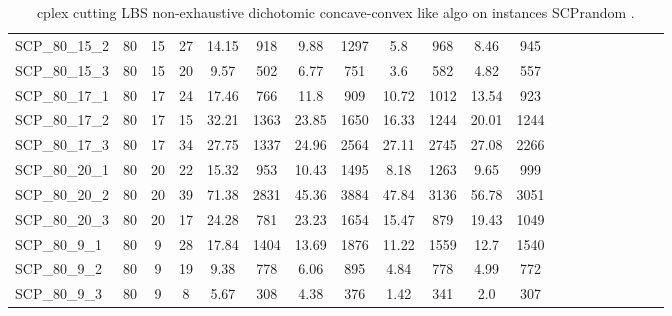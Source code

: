 \begin{sidewaystable}[!ht]
{\begin{tabular}{lccccccccccccccccccc}
SCP\_80\_15\_2 & 80 & 15 & 27 & 14.15 & 918 & 9.88 & 1297 &  \textcolor{blue2}{5.8} & 968 & 8.46 & 945 \\
SCP\_80\_15\_3 & 80 & 15 & 20 & 9.57 & 502 & 6.77 & 751 &  \textcolor{blue2}{3.6} & 582 & 4.82 & 557 \\
SCP\_80\_17\_1 & 80 & 17 & 24 & 17.46 & 766 & 11.8 & 909 &  \textcolor{blue2}{10.72} & 1012 & 13.54 & 923 \\
SCP\_80\_17\_2 & 80 & 17 & 15 & 32.21 & 1363 & 23.85 & 1650 &  \textcolor{blue2}{16.33} & 1244 & 20.01 & 1244 \\
SCP\_80\_17\_3 & 80 & 17 & 34 & 27.75 & 1337 &  \textcolor{blue2}{24.96} & 2564 & 27.11 & 2745 & 27.08 & 2266 \\
SCP\_80\_20\_1 & 80 & 20 & 22 & 15.32 & 953 & 10.43 & 1495 &  \textcolor{blue2}{8.18} & 1263 & 9.65 & 999 \\
SCP\_80\_20\_2 & 80 & 20 & 39 & 71.38 & 2831 &  \textcolor{blue2}{45.36} & 3884 & 47.84 & 3136 & 56.78 & 3051 \\
SCP\_80\_20\_3 & 80 & 20 & 17 & 24.28 & 781 & 23.23 & 1654 &  \textcolor{blue2}{15.47} & 879 & 19.43 & 1049 \\
SCP\_80\_9\_1 & 80 & 9 & 28 & 17.84 & 1404 & 13.69 & 1876 &  \textcolor{blue2}{11.22} & 1559 & 12.7 & 1540 \\
SCP\_80\_9\_2 & 80 & 9 & 19 & 9.38 & 778 & 6.06 & 895 &  \textcolor{blue2}{4.84} & 778 & 4.99 & 772 \\
SCP\_80\_9\_3 & 80 & 9 & 8 & 5.67 & 308 & 4.38 & 376 &  \textcolor{blue2}{1.42} & 341 & 2.0 & 307 \\
\bottomrule
\end{tabular}
}%
\caption{cplex cutting LBS non-exhaustive dichotomic concave-convex like algo on instances SCPrandom .}
\label{tab:table_lambda_limits_SCPrandom }
\end{sidewaystable}
